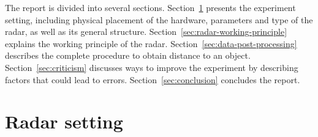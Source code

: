 \documentclass{article}
\begin{document}
The report is divided into several sections.
Section~\ref{sec:setting} presents the experiment setting, including physical placement of the hardware, parameters and type of the radar, as well as its general structure.
Section~\ref{sec:radar-working-principle} explains the working principle of the radar.
Section~\ref{sec:data-post-processing} describes the complete procedure to obtain distance to an object.
Section~\ref{sec:criticism} discusses ways to improve the experiment by describing factors that could lead to errors.
Section~\ref{sec:conclusion} concludes the report.


\section{Radar setting}
\label{sec:setting}
\end{document}
